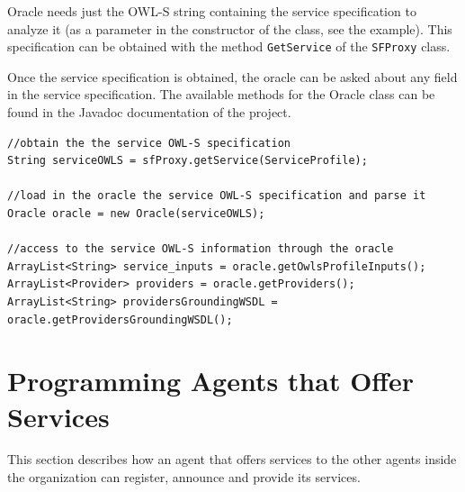 Oracle needs just the OWL-S string containing the service specification to analyze it (as a parameter in the constructor of the class, see the example). This specification can be obtained with the method \lstinline|GetService| of the \lstinline|SFProxy| class.

Once the service specification is obtained, the oracle can be asked about any field in the service specification. The available methods for the Oracle class can be found in the Javadoc documentation of the project.

\begin{lstlisting}
//obtain the the service OWL-S specification
String serviceOWLS = sfProxy.getService(ServiceProfile);

//load in the oracle the service OWL-S specification and parse it
Oracle oracle = new Oracle(serviceOWLS);

//access to the service OWL-S information through the oracle
ArrayList<String> service_inputs = oracle.getOwlsProfileInputs();
ArrayList<Provider> providers = oracle.getProviders();
ArrayList<String> providersGroundingWSDL = oracle.getProvidersGroundingWSDL();
\end{lstlisting}





\section{Programming Agents that Offer Services}
This section describes how an agent that offers services to the other agents inside the organization can register, announce and provide its services.



